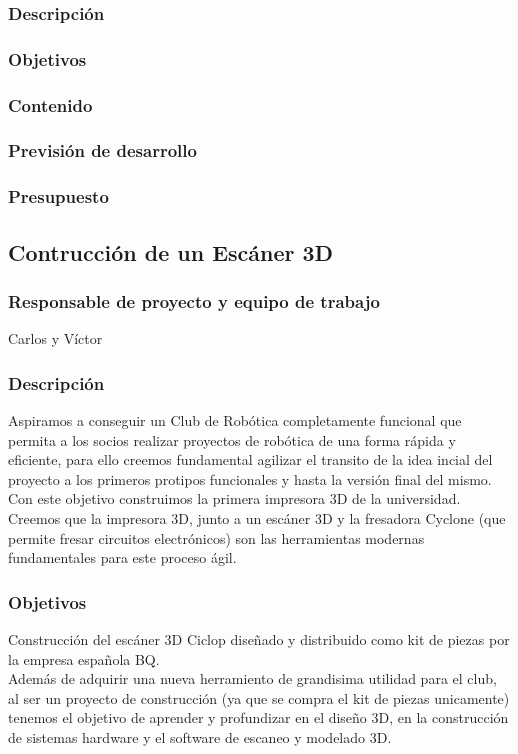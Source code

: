 \documentclass[12pt,twoside]{report}
\begin{document}
\subsubsection{Descripción}
\subsubsection{Objetivos}
\subsubsection{Contenido}
\subsubsection{Previsión de desarrollo}
\subsubsection{Presupuesto}


\subsection{Contrucción de un Escáner 3D}
\subsubsection{Responsable de proyecto y equipo de trabajo}
Carlos y Víctor
\subsubsection{Descripción}
Aspiramos a conseguir un Club de Robótica completamente funcional que permita a los socios realizar proyectos de robótica de una forma rápida y eficiente, para ello creemos fundamental agilizar el transito de la idea incial del proyecto a los primeros protipos funcionales y hasta la versión final del mismo. \\
Con este objetivo construimos la primera impresora 3D de la universidad. Creemos que la impresora 3D, junto a un escáner 3D y la fresadora Cyclone (que permite fresar circuitos electrónicos) son las herramientas modernas fundamentales para este proceso ágil.

\subsubsection{Objetivos}
Construcción del escáner 3D Ciclop diseñado y distribuido como kit de piezas por la empresa española BQ.\\
Además de adquirir una nueva herramiento de grandisima utilidad para el club, al ser un proyecto de construcción (ya que se compra el kit de piezas unicamente) tenemos el objetivo de aprender y profundizar en el diseño 3D, en la construcción de sistemas hardware y el software de escaneo y modelado 3D.
\end{document}
